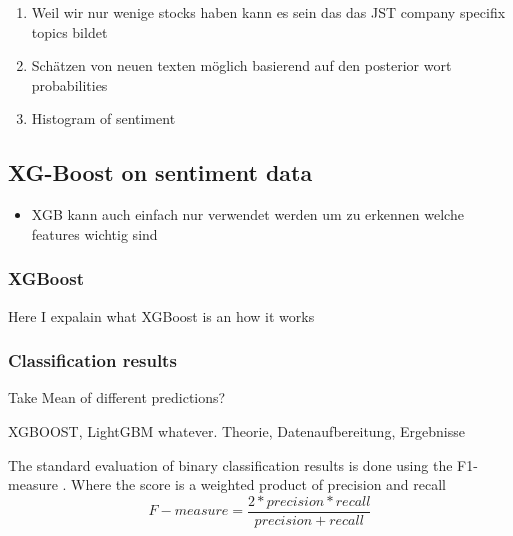\begin{enumerate}
    \item Weil wir nur wenige stocks haben kann es sein das das JST company specifix topics bildet
    \item Schätzen von neuen texten möglich basierend auf den posterior wort probabilities
    \item Histogram of sentiment
\end{enumerate}




\subsection{XG-Boost on sentiment data}
\begin{itemize}
    \item XGB kann auch einfach nur verwendet werden um zu erkennen welche features wichtig sind
\end{itemize}
\subsubsection{XGBoost}
Here I expalain what XGBoost is an how it works

\subsubsection{Classification results}
Take Mean of different predictions?

XGBOOST, LightGBM whatever. 
Theorie, Datenaufbereitung, Ergebnisse


The standard evaluation of binary classification results is done using the F1-measure \citep{HADDI201326}. Where the score is a weighted product of precision and recall
\begin{equation}
    F-measure = \frac{2*precision * recall}{precision + recall}
\end{equation}

